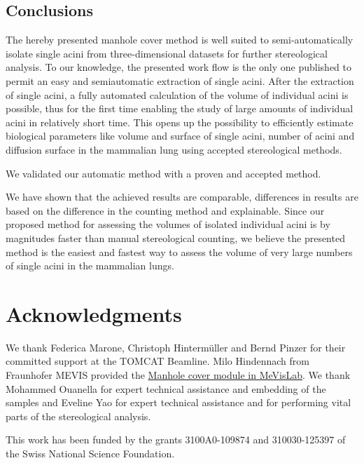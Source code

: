 \documentclass[twoside,paper=a4,abstract=true,english,DIV=calc]{scrartcl}
\begin{document}
\subsection{Conclusions}
The hereby presented manhole cover method is well suited to semi-automatically isolate single acini from three-dimensional datasets for further stereological analysis.
To our knowledge, the presented work flow is the only one published to permit an easy and semiautomatic extraction of single acini.
After the extraction of single acini, a fully automated calculation of the volume of individual acini is possible, thus for the first time enabling the study of large amounts of individual acini in relatively short time.
This opens up the possibility to efficiently estimate biological parameters like volume and surface of single acini, number of acini and diffusion surface in the mammalian lung using accepted stereological methods.

We validated our automatic method with a proven and accepted method.

We have shown that the achieved results are comparable, differences in results are based on the difference in the counting method and explainable.
Since our proposed method for assessing the volumes of isolated individual acini is by magnitudes faster than manual stereological counting, we believe the presented method is the easiest and fastest way to assess the volume of very large numbers of single acini in the mammalian lungs.

\clearpage
\section{Acknowledgments}
We thank Federica Marone, Christoph Hintermüller and Bernd Pinzer for their committed support at the TOMCAT Beamline.
Milo Hindennach from Fraunhofer MEVIS provided the \href{http://www.mevis-research.de/cgi-bin/discus/board-auth.cgi?lm=1282233250&file=/839/11760.html}{Manhole cover module in MeVisLab}.
We thank Mohammed Ouanella for expert technical assistance and embedding of the samples and Eveline Yao for expert technical assistance and for performing vital parts of the stereological analysis.

This work has been funded by the grants 3100A0-109874 and 310030-125397 of the Swiss National Science Foundation.

\clearpage
\singlespacing


\end{document}
